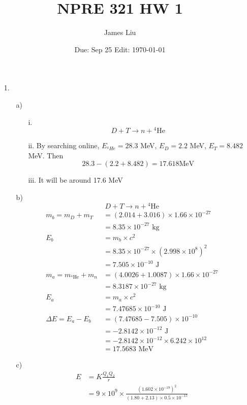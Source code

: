 \documentclass{article}
\date{Due: Sep 25 Edit: \today}
\title{NPRE 321 HW 1}
\author{James Liu}
\begin{document}
\maketitle
\begin{itemize}
    \item [1.] 
    \begin{itemize}
        \item [a)]
        \begin{itemize}
            \item [i.] \[D+T\rightarrow n+{}^4\text{He}\]
            \item [ii.] By searching online, \(E_{{}^4He}=28.3\) MeV, \(E_D = 2.2\) MeV, \(E_{T}=8.482\) MeV. Then 
            \[28.3-(2.2+8.482)= 17.618 \text{MeV}\]
            \item [iii.] It will be around 17.6 MeV
        \end{itemize}
        \item [b)]
        \[D+T\rightarrow n+{}^4\text{He}\]
        \begin{align*}
            m_b = m_D+m_T&=(2.014+3.016)\times1.66\times 10^{-27}\\
            &=8.35\times 10^{-27} \text{ kg}\\
            E_b &=m_b\times c^2\\
            &=8.35\times 10^{-27} \times \left(2.998\times 10^8\right)^2\\
            &=7.505\times 10^{-10} \text{ J}\\
            m_a = m_{{}^4\text{He}}+m_n&=(4.0026+1.0087)\times 1.66\times 10^{-27}\\
            &=8.3187\times 10^{-27} \text{ kg}\\
            E_a &= m_a\times c^2\\
            &=7.47685\times 10^{-10} \text{ J}\\
            \Delta E = E_a-E_b &= (7.47685-7.505)\times 10^{-10}\\
            &=-2.8142\times 10^{-12} \text{ J}\\
            &=-2.8142\times 10^{-12}\times 6.242\times 10^{12}\\
            &=17.5683 \text{ MeV}
        \end{align*}
        \newpage
        \item [c)]
        \begin{align*}
            E &= K\frac{Q_1Q_2}{r}\\
            &=9\times 10^9\times \frac{\left(1.602\times 10^{-19}\right)^2}{(1.80+2.13)\times 0.5 \times 10^{-15}}

\end{align*}
\end{itemize}
\end{itemize}
\end{document}
